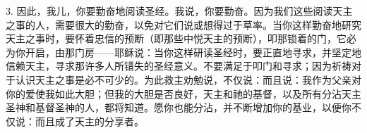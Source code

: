 3. 因此，我儿，你要勤奋地阅读圣经。我说，你要勤奋。因为我们这些阅读天主之事的人，需要很大的勤奋，以免对它们说或想得过于草率。当你这样勤奋地研究天主之事时，要怀着忠信的预断（即那些中悦天主的预断），叩那锁着的门，它必为你开启，由那门房——耶稣说：当你这样研读圣经时，要正直地寻求，并坚定地信赖天主，寻求那许多人所错失的圣经意义。不要满足于叩门和寻求；因为祈祷对于认识天主之事是必不可少的。为此救主劝勉说，不仅说：而且说：我作为父亲对你的爱使我如此大胆；但我的大胆是否良好，天主和祂的基督，以及所有分沾天主圣神和基督圣神的人，都将知道。愿你也能分沾，并不断增加你的基业，以便你不仅说：而且成了天主的分享者。\par

